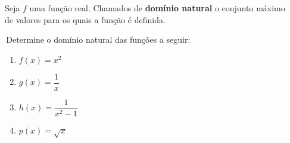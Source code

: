 \begin{frame}
  \begin{columns}[onlytextwidth]
    \begin{column}{0.49\textwidth}\vspace*{-0.5cm}
      \begin{definition}
        Seja $f$ uma função real. Chamados de \textbf{domínio natural} o conjunto máximo de valores para os quais a função é definida.
      \end{definition}
      \begin{example-highlight}
        \,Determine o domínio natural das funções a seguir:
        \begin{enumerate}
          \item $f(x) = x^{2}$
          \item $g(x) = \dfrac{1}{x}$
          \item $h(x) = \dfrac{1}{x^{2}-1}$
          \item $p(x) = \sqrt{x}$
        \end{enumerate}
      \end{example-highlight}
    \end{column}
    \begin{column}{0.49\textwidth}
    \end{column}
  \end{columns}
\end{frame}
